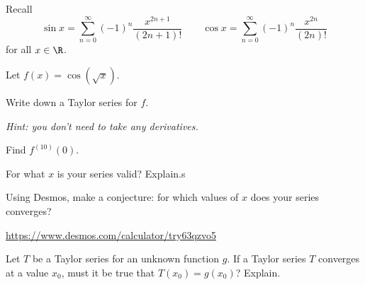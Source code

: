 \documentclass{workbook}
\begin{document}
\begin{slide}
	\question
	Recall 
	\[
		\sin x = \sum_{n=0}^\infty (-1)^n\frac{x^{2n+1}}{(2n+1)!}
		\qquad
		\cos x = \sum_{n=0}^\infty (-1)^n\frac{x^{2n}}{(2n)!}
	\]
	for all $x\in\R$.

	Let $f(x)=\cos(\sqrt{x})$.

	\begin{parts}
		\item Write down a Taylor series for $f$.

		\emph{Hint: you don't need to take any derivatives.}

		\item Find $f^{(10)}(0)$.
		
		\item For what $x$ is your series valid? Explain.s

		\item Using Desmos, make a conjecture: for which values of $x$ does your series converges?

		{\small\url{https://www.desmos.com/calculator/try63qzvo5}}

		\item Let $T$ be a Taylor series for an unknown function $g$.
		If a Taylor series $T$ converges at a value $x_0$, must it be true that $T(x_0)=g(x_0)$?
		Explain. 

	\end{parts}
\end{slide}
\end{document}

